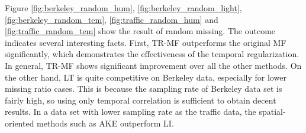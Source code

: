 Figure \ref{fig:berkeley_random_hum}, \ref{fig:berkeley_random_light}, \ref{fig:berkeley_random_tem}, \ref{fig:traffic_random_hum} and \ref{fig:traffic_random_tem} show the result of random missing. The outcome indicates several interesting facts. First, TR-MF outperforms the original MF significantly, which demonstrates the effectiveness of the temporal regularization. In general, TR-MF shows significant improvement over all the other methods. On the other hand, LT is quite competitive on Berkeley data, especially for lower missing ratio cases. This is because the sampling rate of Berkeley data set is fairly high, so using only temporal correlation is sufficient to obtain decent results. In a data set with lower sampling rate as the traffic data, the spatial-oriented methods such as AKE outperform LI. 

%
%
